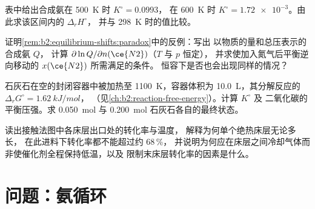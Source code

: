\begin{exercise}[$\star\star$]\label{exo:b2:equilibrium-shifts:9}
表中给出合成氨在 \qty{500}{K} 时 $K^\circ = 0.0993$，
在 \qty{600}{K} 时 $K^\circ = \num{1.72e-3}$。由此求该区间内的 $\Delta_r H^\circ$，
并与 \qty{298}{K} 时的值比较。
\end{exercise}

\begin{exercise}[$\star\star\star$]\label{exo:b2:equilibrium-shifts:10}
证明\cref{rem:b2:equilibrium-shifts:paradox}中的反例：写出
以物质的量和总压表示的合成氨 $Q$，
计算 $\partial\ln Q/\partial n(\ce{N2})$（$T$ 与 $p$ 恒定），
并求使加入氮气后平衡逆向移动的 $x(\ce{N2})$ 所需满足的条件。
恒容下是否也会出现同样的情况？
\end{exercise}

\begin{exercise}[$\star\star\star$]\label{exo:b2:equilibrium-shifts:11}
石灰石在空的封闭容器中被加热至 \qty{1100}{K}，容器体积为
\qty{10.0}{L}，其分解反应的 $\Delta_r G^\circ = \qty{1.62}{kJ/mol}$，
（见\cref{ch:b2:reaction-free-energy}）。计算 $K^\circ$ 及
二氧化碳的平衡压强。求
\qty{0.050}{mol} 与 \qty{0.200}{mol} 石灰石各自的最终状态。
\end{exercise}

\begin{exercise}[$\star\star\star$]\label{exo:b2:equilibrium-shifts:12}
读出接触法图中各床层出口处的转化率与温度，
解释为何单个绝热床层无论多长，
在此进料下转化率都不能超过约 68\,\%，
并说明为何应在床层之间冷却气体而非使催化剂全程保持低温，以及
限制末床层转化率的因素是什么。
\end{exercise}

\section{问题：氨循环}


